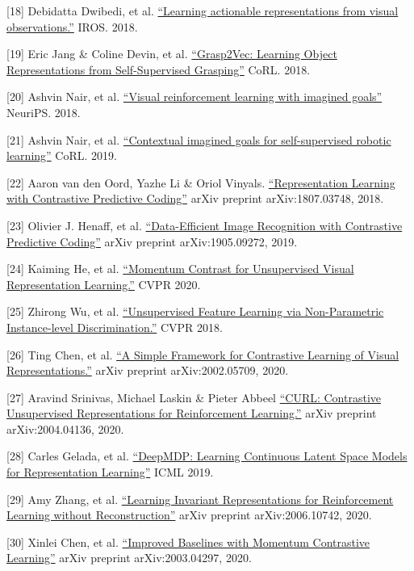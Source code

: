 {[}18{]} Debidatta Dwibedi, et al. \href{https://arxiv.org/abs/1808.00928}{``Learning actionable representations from visual observations.''} IROS. 2018.

{[}19{]} Eric Jang \& Coline Devin, et al. \href{https://arxiv.org/abs/1811.06964}{``Grasp2Vec: Learning Object Representations from Self-Supervised Grasping''} CoRL. 2018.

{[}20{]} Ashvin Nair, et al. \href{https://arxiv.org/abs/1807.04742}{``Visual reinforcement learning with imagined goals''} NeuriPS. 2018.

{[}21{]} Ashvin Nair, et al. \href{https://arxiv.org/abs/1910.11670}{``Contextual imagined goals for self-supervised robotic learning''} CoRL. 2019.

{[}22{]} Aaron van den Oord, Yazhe Li \& Oriol Vinyals. \href{https://arxiv.org/abs/1807.03748}{``Representation Learning with Contrastive Predictive Coding''} arXiv preprint arXiv:1807.03748, 2018.

{[}23{]} Olivier J. Henaff, et al. \href{https://arxiv.org/abs/1905.09272}{``Data-Efficient Image Recognition with Contrastive Predictive Coding''} arXiv preprint arXiv:1905.09272, 2019.

{[}24{]} Kaiming He, et al. \href{https://arxiv.org/abs/1911.05722}{``Momentum Contrast for Unsupervised Visual Representation Learning.''} CVPR 2020.

{[}25{]} Zhirong Wu, et al. \href{https://arxiv.org/abs/1805.01978v1}{``Unsupervised Feature Learning via Non-Parametric Instance-level Discrimination.''} CVPR 2018.

{[}26{]} Ting Chen, et al. \href{https://arxiv.org/abs/2002.05709}{``A Simple Framework for Contrastive Learning of Visual Representations.''} arXiv preprint arXiv:2002.05709, 2020.

{[}27{]} Aravind Srinivas, Michael Laskin \& Pieter Abbeel \href{https://arxiv.org/abs/2004.04136}{``CURL: Contrastive Unsupervised Representations for Reinforcement Learning.''} arXiv preprint arXiv:2004.04136, 2020.

{[}28{]} Carles Gelada, et al. \href{https://arxiv.org/abs/1906.02736}{``DeepMDP: Learning Continuous Latent Space Models for Representation Learning''} ICML 2019.

{[}29{]} Amy Zhang, et al. \href{https://arxiv.org/abs/2006.10742}{``Learning Invariant Representations for Reinforcement Learning without Reconstruction''} arXiv preprint arXiv:2006.10742, 2020.

{[}30{]} Xinlei Chen, et al. \href{https://arxiv.org/abs/2003.04297}{``Improved Baselines with Momentum Contrastive Learning''} arXiv preprint arXiv:2003.04297, 2020.

